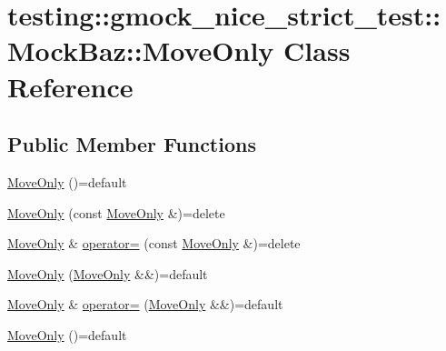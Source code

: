 \hypertarget{classtesting_1_1gmock__nice__strict__test_1_1_mock_baz_1_1_move_only}{}\section{testing\+::gmock\+\_\+nice\+\_\+strict\+\_\+test\+::Mock\+Baz\+::Move\+Only Class Reference}
\label{classtesting_1_1gmock__nice__strict__test_1_1_mock_baz_1_1_move_only}
\subsection*{Public Member Functions}
\begin{DoxyCompactItemize}
\item 
\mbox{\hyperlink{classtesting_1_1gmock__nice__strict__test_1_1_mock_baz_1_1_move_only_afb1f7d62babd32bbc8219bdc666fea83}{Move\+Only}} ()=default
\item 
\mbox{\hyperlink{classtesting_1_1gmock__nice__strict__test_1_1_mock_baz_1_1_move_only_a1d65fbd2e662ac36766eddd1afc27dc5}{Move\+Only}} (const \mbox{\hyperlink{classtesting_1_1gmock__nice__strict__test_1_1_mock_baz_1_1_move_only}{Move\+Only}} \&)=delete
\item 
\mbox{\hyperlink{classtesting_1_1gmock__nice__strict__test_1_1_mock_baz_1_1_move_only}{Move\+Only}} \& \mbox{\hyperlink{classtesting_1_1gmock__nice__strict__test_1_1_mock_baz_1_1_move_only_ab2fb7928f447be64460417dd63e55b1d}{operator=}} (const \mbox{\hyperlink{classtesting_1_1gmock__nice__strict__test_1_1_mock_baz_1_1_move_only}{Move\+Only}} \&)=delete
\item 
\mbox{\hyperlink{classtesting_1_1gmock__nice__strict__test_1_1_mock_baz_1_1_move_only_add8e748eb951f33836f483c258e0236a}{Move\+Only}} (\mbox{\hyperlink{classtesting_1_1gmock__nice__strict__test_1_1_mock_baz_1_1_move_only}{Move\+Only}} \&\&)=default
\item 
\mbox{\hyperlink{classtesting_1_1gmock__nice__strict__test_1_1_mock_baz_1_1_move_only}{Move\+Only}} \& \mbox{\hyperlink{classtesting_1_1gmock__nice__strict__test_1_1_mock_baz_1_1_move_only_a8087ccdb93d18a866b948620f6bb9cff}{operator=}} (\mbox{\hyperlink{classtesting_1_1gmock__nice__strict__test_1_1_mock_baz_1_1_move_only}{Move\+Only}} \&\&)=default
\item 
\mbox{\hyperlink{classtesting_1_1gmock__nice__strict__test_1_1_mock_baz_1_1_move_only_afb1f7d62babd32bbc8219bdc666fea83}{Move\+Only}} ()=default
\item 

\end{DoxyCompactItemize}

